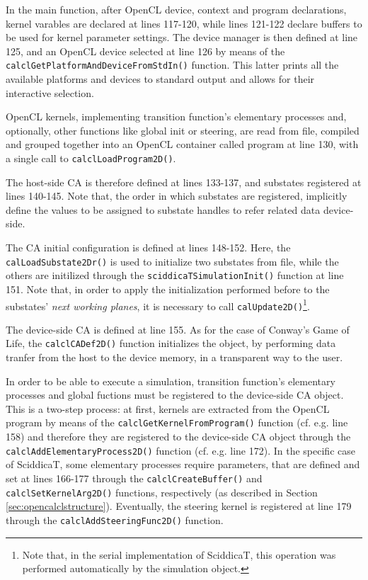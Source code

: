 In the main function, after OpenCL device, context and program
declarations, kernel varables are declared at lines 117-120, while
lines 121-122 declare buffers to be used for kernel parameter
settings.  The device manager is then defined at line 125, and an
OpenCL device selected at line 126 by means of the
\verb'calclGetPlatformAndDeviceFromStdIn()' function.  This latter
prints all the available platforms and devices to standard output and
allows for their interactive selection.

OpenCL kernels, implementing transition function's elementary
processes and, optionally, other functions like global init or
steering, are read from file, compiled and grouped together into an
OpenCL container called program at line 130, with a single call to
\verb'calclLoadProgram2D()'.

The host-side CA is therefore defined at lines 133-137, and
substates registered at lines 140-145. Note that, the order in which
substates are registered, implicitly define the values to be assigned
to substate handles to refer related data device-side.

The CA initial configuration is defined at lines 148-152. Here, the
\verb'calLoadSubstate2Dr()' is used to initialize two substates from
file, while the others are initilized through the
\verb'sciddicaTSimulationInit()' function at line 151. Note that, in
order to apply the initialization performed before to the substates'
\emph{next working planes}, it is necessary to call
\verb'calUpdate2D()'\footnote{Note that, in the serial implementation
  of SciddicaT, this operation was performed automatically by the
  simulation object.}.

The device-side CA is defined at line 155. As for the case of Conway's
Game of Life, the \verb'calclCADef2D()' function initializes the
object, by performing data tranfer from the host to the device memory,
in a transparent way to the user.

In order to be able to execute a simulation, transition function's
elementary processes and global fuctions must be registered to the
device-side CA object. This is a two-step process: at first, kernels
are extracted from the OpenCL program by means of the
\verb'calclGetKernelFromProgram()' function (cf. e.g. line 158) and
therefore they are registered to the device-side CA object through the
\verb'calclAddElementaryProcess2D()' function (cf. e.g. line 172). In
the specific case of SciddicaT, some elementary processes require
parameters, that are defined and set at lines 166-177 through the
\verb'calclCreateBuffer()' and \verb'calclSetKernelArg2D()' functions,
respectively (as described in Section
\ref{sec:opencalclstructure}). Eventually, the steering kernel is
registered at line 179 through the \verb'calclAddSteeringFunc2D()'
function.

